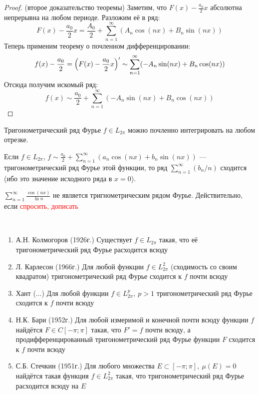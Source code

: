 \begin{proof} (второе доказательство теоремы)
	Заметим, что $F(x) - \frac{a_0}{2}x$ абсолютна непрерывна на любом периоде. Разложим её в ряд:
	\[
		F(x) - \frac{a_0}{2}x = \frac{A_0}{2} + \sum_{n = 1}^\infty (A_n\cos(nx) + B_n\sin(nx))
	\]
	Теперь применим теорему о почленном дифференцировании:
	\[
		f(x) - \frac{a_0}{2} = \left(F(x) - \frac{a_0}{2}x\right)' \sim \sum_{n = 1}^\infty (-A_n\sin(nx) + B_n\cos(nx))
	\]
	Отсюда получим искомый ряд:
	\[
		f(x) \sim \frac{a_0}{2} + \sum_{n = 1}^\infty (-A_n\sin(nx) + B_n\cos(nx))
	\]
\end{proof}

\begin{corollary}
	Тригонометрический ряд Фурье $f \in L_{2\pi}$ можно почленно интегрировать на любом отрезке.
\end{corollary}

\begin{corollary}
	Если $f \in L_{2\pi}$, $f \sim \frac{a_0}{2} + \sum_{n = 1}^\infty (a_n\cos(nx) + b_n\sin(nx))$ --- тригонометрический ряд Фурье этой функции, то ряд $\sum_{n = 1}^\infty (b_n / n)$ сходится (ибо это значение исходного ряда в $x = 0$).
\end{corollary}

\begin{example}
	$\sum_{n = 1}^\infty \frac{\cos(nx)}{\ln n}$ не является тригнометрическим рядом Фурье. Действительно, если \textcolor{red}{спросить, дописать}
\end{example}

\begin{note}~
	\begin{enumerate}
		\item А.Н. Колмогоров (1926г.) Существует $f \in L_{2\pi}$ такая, что её тригонометрический ряд Фурье расходится всюду
		
		\item Л. Карлесон (1966г.) Для любой функции $f \in L_{2\pi}^2$ (сходимость со своим квадратом) тригонометрический ряд Фурье сходится к $f$ почти всюду
		
		\item Хант (...) Для любой функции $f \in L_{2\pi}^p,\ p > 1$ тригонометрический ряд Фурье сходится к $f$ почти всюду
		
		\item Н.К. Бари (1952г.) Для любой измеримой и конечной почти всюду функции $f$ найдётся $F \in C[-\pi; \pi]$ такая, что $F' = f$ почти всюду, а продифференцированный тригонометрический ряд Фурье функции $F$ сходится к $f$ почти всюду
		
		\item С.Б. Стечкин (1951г.) Для любого множества $E \subset [-\pi; \pi],\ \mu(E) = 0$ найдётся такая функция $f \in L_{2\pi}^2$ такая, что тригонометрический ряд Фурье расходится всюду на $E$
	\end{enumerate}
\end{note}

